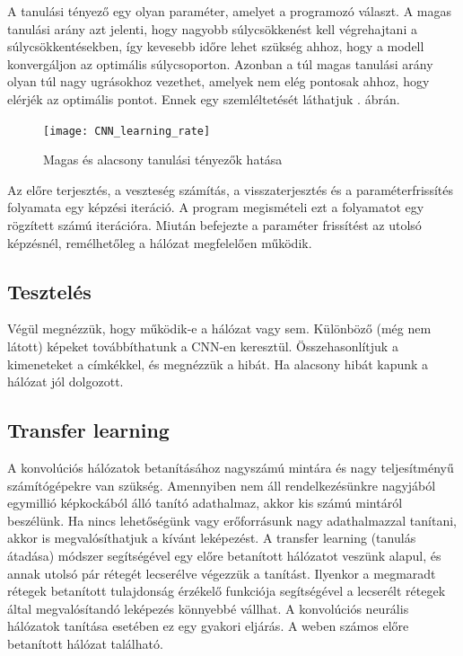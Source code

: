 A tanulási tényező egy olyan paraméter, amelyet a programozó választ. A magas tanulási arány azt jelenti, hogy nagyobb súlycsökkenést kell végrehajtani a súlycsökkentésekben, így kevesebb időre lehet szükség ahhoz, hogy a modell konvergáljon az optimális súlycsoporton. Azonban a túl magas tanulási arány olyan túl nagy ugrásokhoz vezethet, amelyek nem elég pontosak ahhoz, hogy elérjék az optimális pontot. Ennek egy szemléltetését láthatjuk . ábrán.

\begin{figure}
\centering
\texttt{[image: CNN\_learning\_rate]}
\caption{Magas és alacsony tanulási tényezők hatása}
\label{fig:CNN_learning_rate}
\end{figure}

Az előre terjesztés, a veszteség számítás, a visszaterjesztés és a paraméterfrissítés folyamata egy képzési iteráció. A program megismételi ezt a folyamatot egy rögzített számú iterációra. Miután befejezte a paraméter frissítést az utolsó képzésnél, remélhetőleg a hálózat megfelelően működik.

\subsection{Tesztelés}

Végül megnézzük, hogy működik-e a hálózat vagy sem. Különböző (még nem látott) képeket továbbíthatunk a CNN-en keresztül. Összehasonlítjuk a kimeneteket a címkékkel, és megnézzük a hibát. Ha alacsony hibát kapunk a hálózat jól dolgozott.

\subsection{Transfer learning}

A konvolúciós hálózatok betanításához nagyszámú mintára és nagy teljesítményű számítógépekre van szükség. Amennyiben nem áll rendelkezésünkre nagyjából egymillió képkockából álló tanító adathalmaz, akkor kis számú mintáról beszélünk. Ha nincs lehetőségünk vagy erőforrásunk nagy adathalmazzal tanítani, akkor is megvalósíthatjuk a kívánt leképezést. A transfer learning (tanulás átadása) módszer segítségével egy előre betanított hálózatot veszünk alapul, és annak utolsó pár rétegét lecserélve végezzük a tanítást. Ilyenkor a megmaradt rétegek betanított tulajdonság érzékelő funkciója segítségével a lecserélt rétegek által megvalósítandó leképezés könnyebbé vállhat. A konvolúciós neurális hálózatok tanítása esetében ez egy gyakori eljárás. A weben számos előre betanított hálózat található.

